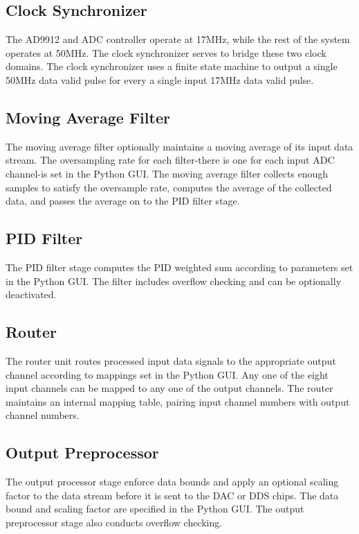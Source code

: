 \documentclass[11pt]{article}
\begin{document}
\subsection{Clock Synchronizer}

The AD9912 and ADC controller operate at 17MHz, while the rest of the
system operates at 50MHz. The clock synchronizer serves to bridge these
two clock domains. The clock synchronizer uses a finite state machine to
output a single 50MHz data valid pulse for every a single input 17MHz
data valid pulse.

\subsection{Moving Average Filter}

The moving average filter optionally maintains a moving average of its
input data stream. The oversampling rate for each filter-there is one
for each input ADC channel-is set in the Python GUI\@. The moving average
filter collects enough samples to satisfy the oversample rate,
computes the average of the collected data, and passes the average on to
the PID filter stage.

\subsection{PID Filter}

The PID filter stage computes the PID weighted sum according to
parameters set in the Python GUI\@. The filter includes overflow checking
and can be optionally deactivated.

\subsection{Router}

The router unit routes processed input data signals to the appropriate
output channel according to mappings set in the Python GUI\@. Any one of
the eight input channels can be mapped to any one of the output
channels. The router maintains an internal mapping table, pairing input
channel numbers with output channel numbers.

\subsection{Output Preprocessor}

The output processor stage enforce data bounds and apply an optional scaling
factor to the data stream before it is sent to the DAC or DDS chips. The
data bound and scaling factor are specified in the Python GUI\@. The
output preprocessor stage also conducts overflow checking.
\end{document}
